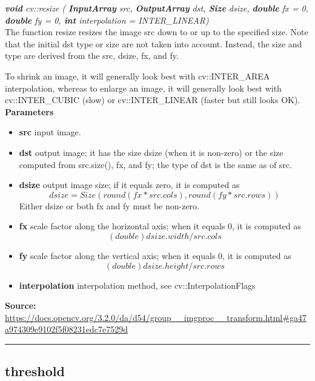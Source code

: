 \textit{\textbf{void} cv::resize (
        \textbf{InputArray} src,
		\textbf{OutputArray}  	dst,
		\textbf{Size}  	dsize,
		\textbf{double}  	fx = 0,
		\textbf{double}  	fy = 0,
		\textbf{int}  	interpolation = INTER\_LINEAR)}\\
		
The function resize resizes the image src down to or up to the specified size. Note that the initial dst type or size are not taken into account. Instead, the size and type are derived from the src, dsize, fx, and fy.

To shrink an image, it will generally look best with cv::INTER\_AREA interpolation, whereas to enlarge an image, it will generally look best with cv::INTER\_CUBIC (slow) or cv::INTER\_LINEAR (faster but still looks OK).\\

\textbf{Parameters}
\begin{itemize}
    \item \textbf{src} input image.
    \item \textbf{dst} output image; it has the size dsize (when it is non-zero) or the size computed from src.size(), fx, and fy; the type of dst is the same as of src.
    \item \textbf{dsize} output image size; if it equals zero, it is computed as $$dsize = Size(round(fx*src.cols), round(fy*src.rows))$$
    Either dsize or both fx and fy must be non-zero.
    \item \textbf{fx} scale factor along the horizontal axis; when it equals 0, it is computed as $$(double)dsize.width/src.cols$$
    \item \textbf{fy}	scale factor along the vertical axis; when it equals 0, it is computed as $$(double)dsize.height/src.rows$$
    \item \textbf{interpolation}	interpolation method, see cv::InterpolationFlags
\end{itemize}

\begin{adjustbox}{width=1.2\textwidth,center=\textwidth}
\textbf{Source:} \url{https://docs.opencv.org/3.2.0/da/d54/group__imgproc__transform.html#ga47a974309e9102f5f08231edc7e7529d}
\end{adjustbox}

\noindent\rule{\textwidth}{0.5pt}


\subsection*{threshold}
\label{subsec:opencv_appendix_used_functions_threshold}

